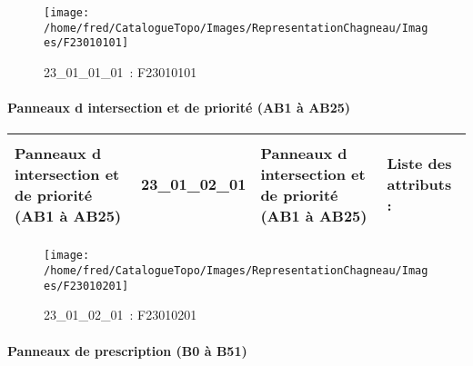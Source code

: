 \documentclass[12pt,titlepage,oneside]{book}
\begin{document}
\begin{figure}[h!]
  \hfill         %
  \begin{minipage}[t]{3cm}
    \begin{center}
      \texttt{[image: /home/fred/CatalogueTopo/Images/RepresentationChagneau/Images/F23010101]}
      \caption[~23\_01\_01\_01]{\small{23\_01\_01\_01~:} \tiny{F23010101}}\label{F23010101}
    \end{center}
  \end{minipage}
\end{figure}


\paragraph{Panneaux d intersection et de priorité (AB1 à AB25)}
\noindent
\vspace{\baselineskip}

\renewcommand{\arraystretch}{1.2}
\begin{supertabular}{|p{10cm}|c|p{13cm}|p{12cm}|}
 Panneaux d intersection et de priorité (AB1 à AB25) & 23\_01\_02\_01 & Panneaux d intersection et de priorité (AB1 à AB25) & Liste des attributs :
\begin{enumerate}
\end{enumerate}
\\
\hline
\end{supertabular}
\begin{figure}[h!]
  \hfill         %
  \begin{minipage}[t]{3cm}
    \begin{center}
      \texttt{[image: /home/fred/CatalogueTopo/Images/RepresentationChagneau/Images/F23010201]}
      \caption[~23\_01\_02\_01]{\small{23\_01\_02\_01~:} \tiny{F23010201}}\label{F23010201}
    \end{center}
  \end{minipage}
\end{figure}


\paragraph{Panneaux de prescription (B0 à B51)}
\noindent
\vspace{\baselineskip}
\end{document}
